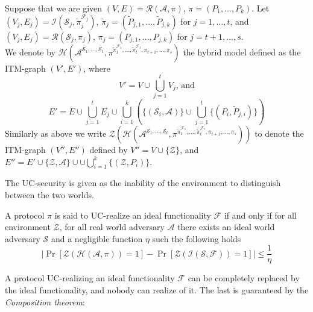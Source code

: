 \documentclass{acm_proc_article-sp}
\begin{document}
\begin{definition}
Suppose that we are given
$(V, E) = \mathcal{R}(\mathcal{A}, \pi)$, $\pi = (P_1, \ldots, P_k)$.
Let $(V_j, E_j) =
\mathcal{I}(\mathcal{S}_j,
            \tilde{\pi}^{\mathcal{F}_j}_j)$,
$\tilde{\pi}_j = (\tilde{P}_{j, 1}, \ldots, \tilde{P}_{j, k})$ for $j = 1, \ldots, t$,
and $(V_j, E_j) = \mathcal{R}(\mathcal{S}_j,\pi_j)$,
$\pi_j = (P_{j, 1}, \ldots, P_{j, k})$ for $j = t+1, \ldots, s$.\\
We denote by
$\mathcal{H}(
    \mathcal{A}^{
        \mathcal{S}_1,
        \ldots,
        \mathcal{S}_t},
    \pi^{
        \tilde{\pi}_1^{\mathcal{F}_1},
        \ldots,
        \tilde{\pi}_t^{\mathcal{F}_t},
        \pi_{t+1},
        \ldots,
        \pi_s})$
the hybrid model defined as the ITM-graph $(V', E')$, where
$$V' = V \cup \bigcup_{j=1}^t V_j \textrm{, and}$$
$$E' = 
    E
    \cup
    \bigcup_{j=1}^t E_j
    \cup
    \bigcup_{i=1}^k
        \left(
            \{(\mathcal{S}_i, \mathcal{A})\}
            \cup
            \bigcup_{j=1}^t \{(P_i, \tilde{P}_{j, i})\}
        \right)$$
Similarly as above we write
$\mathcal{Z}(
    \mathcal{H}(
        \mathcal{A}^{
            \mathcal{S}_1,
            \ldots,
            \mathcal{S}_t},
        \pi^{
            \tilde{\pi}_1^{\mathcal{F}_1},
            \ldots,
            \tilde{\pi}_t^{\mathcal{F}_t},
            \pi_{t+1},
            \ldots,
            \pi_s}))$
to denote the ITM-graph $(V'', E'')$ defined by 
$V'' = V \cup \{\mathcal{Z}\}$,
and 
$E'' = 
    E'
    \cup
    \{\mathcal{Z}, \mathcal{A}\}
    \cup 
    \cup \bigcup_{i=1}^k \{(\mathcal{Z}, P_i)\}$.
\end{definition}


The UC-security is given as the inability of the environment to distinguish between the two worlds.

\begin{definition}
A protocol $\pi$ is said to UC-realize an ideal functionality $\mathcal{F}$ if and only if for all environment
$\mathcal{Z}$, for all real world adversary $\mathcal{A}$ there exists an ideal world adversary $\mathcal{S}$
and a negligible function $\eta$ such the following holds
$$\left| \Pr[\mathcal{Z}(\mathcal{H}(\mathcal{A},\pi))=1] - 
	 \Pr[\mathcal{Z}(\mathcal{I}(\mathcal{S},\mathcal{F}))=1] \right| \leq \frac{1}{\eta}$$
\end{definition}

A protocol UC-realizing an ideal functionality $\mathcal{F}$ can be completely replaced by the ideal functionality,
and nobody can realize of it. The last is guaranteed by the \textit{Composition theorem}:
\end{document}
